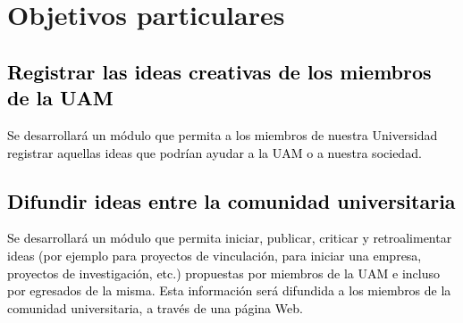 \documentclass[11pt,letterpaper,titlepage]{article}
\begin{document}

\section{Objetivos particulares}
\textcolor{black}{
\subsection{Registrar las ideas creativas de los miembros de la UAM}
Se desarrollar\'a un m\'odulo que permita a los miembros de nuestra Universidad registrar aquellas ideas que podr\'ian ayudar a la UAM o a nuestra sociedad. }


\textcolor{black}{
\subsection{Difundir ideas entre la comunidad universitaria}
Se desarrollar\'a un m\'odulo que permita iniciar, publicar, criticar y retroalimentar ideas (por ejemplo para proyectos de vinculaci\'on, para iniciar una empresa, proyectos de investigaci\'on, etc.) propuestas por miembros de la UAM e incluso por egresados de la misma. Esta informaci\'on ser\'a difundida a los miembros de la comunidad universitaria, a trav\'es de una p\'agina Web.}


\end{document}
